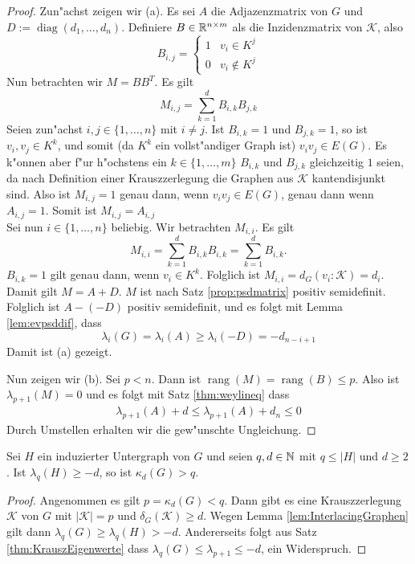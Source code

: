 \begin{proof}
  Zun"achst zeigen wir (a). Es sei $A$ die Adjazenzmatrix von $G$ und $D := \operatorname{diag}(d_1,\dots,d_n)$. Definiere $B\in{\mathbb{R}}^{n\times m}$ als die Inzidenzmatrix von $\mathcal K$, also $$B_{i,j} = \begin{cases}
    1 & v_i \in K^j \\ 0 & v_i \notin K^j
  \end{cases}$$ 
  Nun betrachten wir $M=BB^{T}$. Es gilt
  \[
    M_{i,j} = \sum\limits_{k=1}^{d}B_{i,k}B_{j,k}
  \]
  Seien zun"achst $i,j \in \{1,\dots,n\}$ mit $i\neq j$. Ist $B_{i,k} = 1$ und $B_{j,k} = 1$, so ist $v_i,v_j  \in K^k$, und somit (da $K^k$ ein vollst"andiger Graph ist) $v_iv_j\in E(G)$. Es k"onnen aber f"ur h"ochstens ein $k\in \{1,\dots,m\}$ $B_{i,k}$ und $B_{j,k}$ gleichzeitig $1$ seien, da nach Definition einer Krauszzerlegung die Graphen aus $\mathcal K$ kantendisjunkt sind. Also ist $M_{i,j}= 1 $ genau dann, wenn $v_iv_j\in E(G)$, genau dann wenn $A_{i,j} = 1$. Somit ist $M_{i,j}=A_{i,j}$\\
  Sei nun $i\in\{1,\dots,n\}$ beliebig. Wir betrachten $M_{i,i}$. Es gilt 
  \[
    M_{i,i} = \sum\limits_{k=1}^{d}B_{i,k}B_{i,k} = \sum\limits_{k=1}^{d} B_{i,k}.
  \]
  $B_{i,k}=1$ gilt genau dann, wenn $v_i \in K^k$. Folglich ist $M_{i,i}= d_G(v_i:\mathcal K)= d_i$. Damit gilt $M=A+D$. $M$ ist nach Satz \ref{prop:psdmatrix} positiv semidefinit.
  Folglich ist $A- (-D)$ positiv semidefinit, und es folgt mit Lemma \ref{lem:evpsddif}, dass 
  \begin{equation*}
    \lambda_i(G) = \lambda_i(A) \geq \lambda_i(-D) = -d_{n-i+1}
  \end{equation*}
  Damit ist (a) gezeigt.

  Nun zeigen wir (b). Sei $p<n$. Dann ist $\operatorname{rang}(M)= \operatorname{rang}(B) \leq p$. Also ist $\lambda_{p+1}(M) = 0$ und es folgt mit Satz \ref{thm:weylineq} dass 
  \begin{align*}
    \lambda_{p+1}(A) + d \leq \lambda_{p+1}(A) + d_{n} \leq 0
  \end{align*}
  Durch Umstellen erhalten wir die gew"unschte Ungleichung.
\end{proof}
\begin{corollary}
  \label{cor:Korollar1}
  Sei $H$ ein induzierter Untergraph von $G$ und seien $q,d \in {\mathbb{N}}$ mit $q \leq |H|$ und $d \geq 2$.
  Ist $\lambda_{q}(H) \geq -d$, so ist $\kappa_{d}(G) > q$.
\end{corollary}
\begin{proof}
  Angenommen es gilt $p = \kappa_{d}(G) < q$. Dann gibt es  eine Krauszzerlegung $\mathcal{K}$ von $G$ mit $|\mathcal{K}| = p$ und $\delta_G(\mathcal{K}) \geq d$. Wegen Lemma \ref{lem:InterlacingGraphen} gilt dann $\lambda_{q}(G) \geq \lambda_{q}(H) > -d $. Andererseits folgt aus Satz \ref{thm:KrauszEigenwerte} dass $\lambda_{q}(G) \leq \lambda_{p+1} \leq -d $, ein Widerspruch. 
\end{proof}

